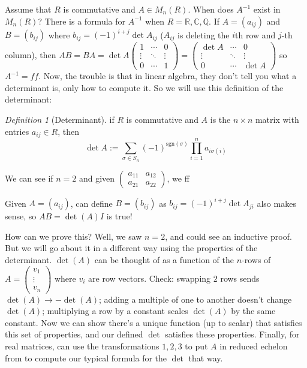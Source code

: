 \documentclass{article}
\theoremstyle{plain}
\theoremstyle{remark}
\newtheorem{definition}{Definition}
\newcommand{\Q}{{\mathbb Q}}
\newcommand{\R}{{\mathbb R}}
\newcommand{\C}{{\mathbb C}}
\begin{document}
Assume that $R$ is commutative and $A \in M_n(R)$.
When does $A^{-1}$ exist in $M_n(R)$?
There is a formula for $A^{-1}$ when $R = \R,\C,\Q$.
If $A = (a_{ij})$ and $B = (b_{ij})$ where $b_{ij} = (-1)^{i+j}\det{A_{ij}}$
($A_{ij}$ is deleting the $i$th row and $j$-th column),
then $AB = BA = \det{A}\begin{pmatrix} 1 & \cdots & 0 \\ \vdots & \ddots & \vdots\\
0 &\cdots &1\end{pmatrix} =
\begin{pmatrix} \det{A} & \cdots & 0 \\ \vdots & \ddots & \vdots\\
0 &\cdots &\det{A}\end{pmatrix}$
so $A^{-1} = ff$.
Now, the trouble is that in linear algebra,
they don't tell you what a determinant is,
only how to compute it.
So we will use this definition of the determinant:
\begin{definition}[Determinant]
	if $R$ is commutative and $A$ is the $n \times n$ matrix with entries $a_{ij} \in R$, then
	\[
		\det{A} := \sum_{\sigma \in S_n} (-1)^{\mathrm{sgn}(\sigma)}
		\prod_{i=1}^n a_{i \sigma(i)}
	\]
\end{definition}
We can see if $n = 2$ and given
$\begin{pmatrix} a_{11} & a_{12} \\ a_{21} & a_{22} \end{pmatrix}$,
we ff

Given $A = (a_{ij})$, can define $B = (b_{ij})$ as
$b_{ij} = (-1)^{i+j}\det{A_{ji}}$ also makes sense,
so $AB = \det(A)I$ is true!

How can we prove this? Well, we saw $n = 2$, and could see an inductive proof.
But we will go about it in a different way using the properties of the determinant.
$\det(A)$ can be thought of as a function of the $n$-rows of
$A = \begin{pmatrix} v_1 \\ \vdots \\ v_n \end{pmatrix}$ where
$v_i$ are row vectors.
Check: swapping $2$ rows sends $\det(A) \to -\det(A)$;
adding a multiple of one to another doesn't change $\det(A)$;
multiplying a row by a constant scales $\det(A)$ by the same constant.
Now we can show there's a unique function (up to scalar) that satisfies this set of properties,
and our defined $\det$ satisfies these properties.
Finally, for real matrices, can use the transformations $1,2,3$ to put $A$ in reduced echelon from
to compute our typical formula for the $\det$ that way.
\end{document}
